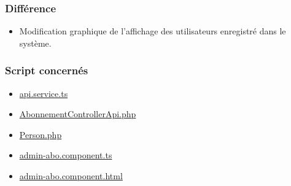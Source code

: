 \subsubsection{Différence}
	\begin{itemize}
		\item Modification graphique de l'affichage des utilisateurs enregistré dans le système. 
	\end{itemize}

\vspace{\baselineskip}
\subsubsection{Script concernés}
	\begin{itemize}
		\item \href{https://github.com/victorsmits/Aquabike/blob/master/frontend/src/app/service/api.service.ts}{api.service.ts}
		\item \href{https://github.com/victorsmits/Aquabike/blob/master/backend/src/Controller/API/AbonnementControllerApi.php}{AbonnementControllerApi.php}
		\item \href{https://github.com/victorsmits/Aquabike/blob/master/backend/src/Entity/Person.php}{Person.php}
		\item \href{https://github.com/victorsmits/Aquabike/blob/master/frontend/src/app/admin-abo/admin-abo.component.ts}{admin-abo.component.ts}
		\item \href{https://github.com/victorsmits/Aquabike/blob/master/frontend/src/app/admin-abo/admin-abo.component.html}{admin-abo.component.html}
	\end{itemize}